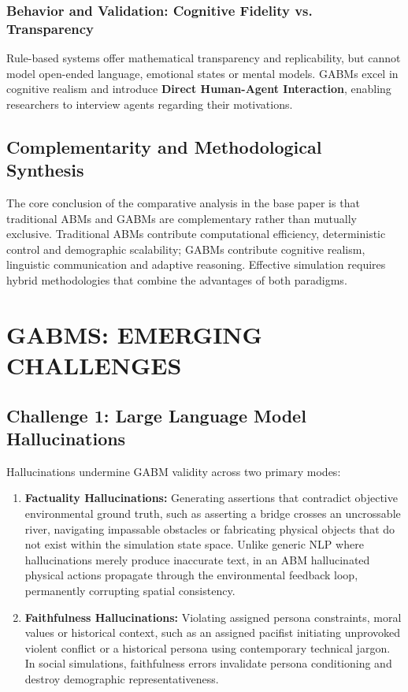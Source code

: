 \documentclass[12pt,a4paper]{report}
\begin{document}
\subsection{Behavior and Validation: Cognitive Fidelity vs. Transparency}
Rule-based systems offer mathematical transparency and replicability, but cannot model open-ended language, emotional states or mental models. GABMs excel in cognitive realism and introduce \textbf{Direct Human-Agent Interaction}, enabling researchers to interview agents regarding their motivations.

\section{Complementarity and Methodological Synthesis}
\label{sec:complementarity}

The core conclusion of the comparative analysis in the base paper is that traditional ABMs and GABMs are complementary rather than mutually exclusive. Traditional ABMs contribute computational efficiency, deterministic control and demographic scalability; GABMs contribute cognitive realism, linguistic communication and adaptive reasoning. Effective simulation requires hybrid methodologies that combine the advantages of both paradigms.


\chapter{GABMS: EMERGING CHALLENGES}
\label{chap:emerging_challenges}

\section{Challenge 1: Large Language Model Hallucinations}
\label{sec:hallucinations}

Hallucinations undermine GABM validity across two primary modes:
\begin{enumerate}[label=\arabic*.]
    \item \textbf{Factuality Hallucinations:} Generating assertions that contradict objective environmental ground truth, such as asserting a bridge crosses an uncrossable river, navigating impassable obstacles or fabricating physical objects that do not exist within the simulation state space. Unlike generic NLP where hallucinations merely produce inaccurate text, in an ABM hallucinated physical actions propagate through the environmental feedback loop, permanently corrupting spatial consistency.
    \item \textbf{Faithfulness Hallucinations:} Violating assigned persona constraints, moral values or historical context, such as an assigned pacifist initiating unprovoked violent conflict or a historical persona using contemporary technical jargon. In social simulations, faithfulness errors invalidate persona conditioning and destroy demographic representativeness.
\end{enumerate}
\end{document}

